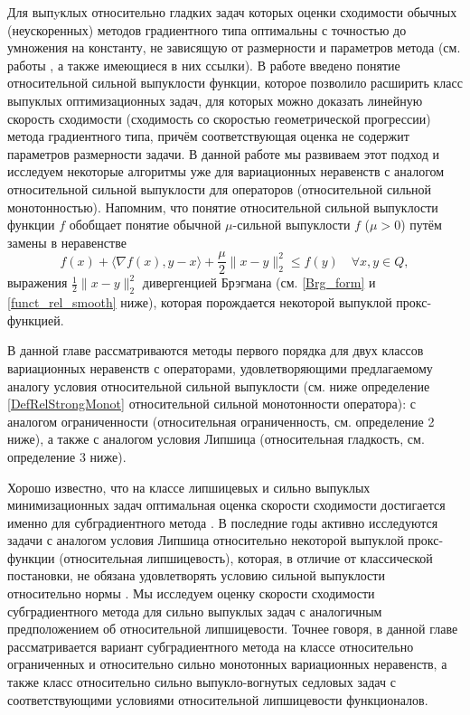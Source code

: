 Для выпyклых относительно гладких задач которых оценки сходимости обычных (неускоренных) методов градиентного типа оптимальны с точностью до умножения на константу, не зависящую от размерности и параметров метода (см. работы \cite{Bauschke,Drag,Dragomir,Lu_Nesterov_2018}, а также имеющиеся в них ссылки). В работе \cite{Lu_Nesterov_2018} введено понятие относительной сильной выпуклости функции, которое позволило расширить класс выпуклых оптимизационных задач, для которых можно доказать линейную скорость сходимости (сходимость со скоростью геометрической прогрессии) метода градиентного типа, причём соответствующая оценка не содержит параметров размерности задачи. В данной работе мы развиваем этот подход и исследуем некоторые алгоритмы уже для вариационных неравенств с аналогом относительной сильной выпуклости для операторов (относительной сильной монотонностью). Напомним, что понятие относительной сильной выпуклости \cite{Lu_Nesterov_2018} функции $f$ обобщает понятие обычной $\mu$-сильной выпуклости $f$ ($\mu > 0$) путём замены в неравенстве 
$$
    f(x) + \langle \nabla{f(x)}, y - x \rangle  + \frac{\mu}{2} \|x - y \|_2^2 \leq f(y) \quad   \forall x, y \in Q,
$$
выражения $\frac{1}{2} \|x - y \|_2^2 $ дивергенцией Брэгмана (см. \eqref{Brg_form} и \eqref{funct_rel_smooth} ниже), которая порождается некоторой выпуклой прокс-функцией. 

В данной главе рассматриваются методы первого порядка для двух классов вариационных неравенств с операторами, удовлетворяющими предлагаемому аналогу условия относительной сильной выпуклости (см. ниже определение  \ref{DefRelStrongMonot} относительной сильной монотонности оператора): с аналогом ограниченности (относительная ограниченность, см. определение 2 ниже), а также с аналогом условия Липшица (относительная гладкость, см. определение 3 ниже).

Хорошо известно, что на классе липшицевых и сильно выпуклых минимизационных задач оптимальная оценка скорости сходимости достигается именно для субградиентного метода \cite{Bach_2012}. В последние годы активно исследуются задачи с аналогом условия Липшица относительно некоторой выпуклой прокс-функции (относительная липшицевость), которая, в отличие от классической постановки, не обязана удовлетворять условию сильной выпуклости относительно нормы \cite{AdaMirr_2021,Lu_2018,Zhou_NIPS_2020}. Мы исследуем оценку скорости сходимости субградиентного метода для сильно выпуклых задач с аналогичным предположением об относительной липшицевости. Точнее говоря, в данной главе рассматривается вариант субградиентного метода на классе относительно ограниченных и относительно сильно монотонных вариационных неравенств, а также класс относительно сильно выпукло-вогнутых седловых задач с соответствующими условиями относительной липшицевости функционалов. 

